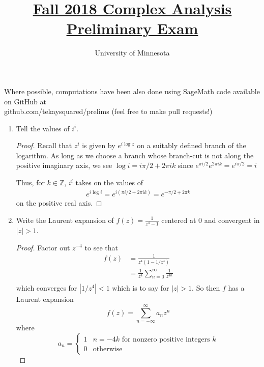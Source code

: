 \documentclass{article}
\title{\href{https://math.umn.edu/sites/math.umn.edu/files/exams/complexf18.pdf}{Fall 2018 Complex Analysis Preliminary Exam}}
\author{University of Minnesota}
\date{}
\begin{document}
\maketitle

Where possible, computations have been also done using SageMath code available on GitHub at \\ github.com/tekaysquared/prelims (feel free to make pull requests!)

\begin{enumerate}

	\item Tell the values of $i^i$.
	
	\begin{proof}
		Recall that $z^i$ is given by $e^{i \log z}$ on a suitably defined branch of the logarithm.
		As long as we choose a branch whose branch-cut is not along the positive imaginary axis, we see
		$\log i = i \pi/2 + 2\pi  i k$ since $e^{\pi i /2}e^{2\pi i k} = e^{i \pi/2} = i$
		
		Thus, for $k \in \mathbb{Z}$, $i^i$ takes on the values of
		\begin{align*}
			e^{i \log i } = e^{ i(  \pi i/2 + 2\pi i k)} = e^{- \pi/2 + 2\pi k} 
		\end{align*}
		  on the positive real axis.
		
	\end{proof}	
	\setcounter{enumi}{1}
	
	\item Write the Laurent expansion of $f(z) = \frac{1}{z^4-1}$ centered at $0$ and convergent in $|z|>1$.
	
	\begin{proof}
		Factor out $z^{-4}$ to see that 
		\begin{align*}
			f(z) &= \frac{1}{z^4 (1 - {1}/{z^4})}\\
			&= \frac{1}{z^4} \sum_{n=0}^\infty \frac{1}{z^{4n}} \\
		\end{align*}
		which converges for $|1/z^4| <1$ which is to say for $|z|>1$.
		So then $f$ has a Laurent expansion
		\[f(z) = \sum_{n = - \infty}^{\infty} a_n z^{n} \]
		where 
		\[ a_n = \begin{cases}
						  1 & n = -4k \text{ for nonzero positive integers }k\\
						  0 & \text{otherwise}
		\end{cases}\]
	\end{proof} 
	

\end{enumerate}
\end{document}
